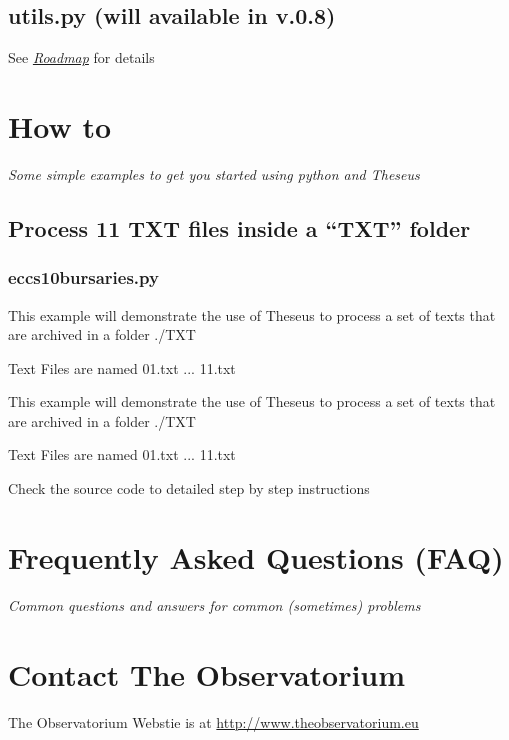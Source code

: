 \documentclass[letterpaper,10pt,english]{sphinxmanual}
\begin{document}
\subsection{utils.py (will available in v.0.8)}
\label{theseus:utils-py-will-available-in-v-0-8}
See {\hyperref[TODO::doc]{\emph{Roadmap}}} for details


\section{How to}
\label{howto::doc}\label{howto:how-to}
\emph{Some simple examples to get you started using python and Theseus}


\subsection{Process 11 TXT files inside a ``TXT'' folder}
\label{howto:module-eccs10bursaries}\label{howto:process-11-txt-files-inside-a-txt-folder}

\subsubsection{eccs10bursaries.py}
\label{howto:eccs10bursaries-py}
This example will demonstrate the use of Theseus to process a set of texts
that are archived in a folder ./TXT

Text Files are named 01.txt ... 11.txt

\begin{fulllineitems}
\label{howto:eccs10bursaries.main}
This example will demonstrate the use of Theseus to process a set of texts
that are archived in a folder ./TXT

Text Files are named 01.txt ... 11.txt

Check the source code to detailed step by step instructions

\end{fulllineitems}



\section{Frequently Asked Questions (FAQ)}
\label{faq::doc}\label{faq:frequently-asked-questions-faq}
\emph{Common questions and answers for common (sometimes) problems}


\section{Contact The Observatorium}
\label{contact::doc}\label{contact:contact-the-observatorium}
The Observatorium Webstie is at \href{http://www.theobservatorium.eu}{http://www.theobservatorium.eu}
\end{document}

